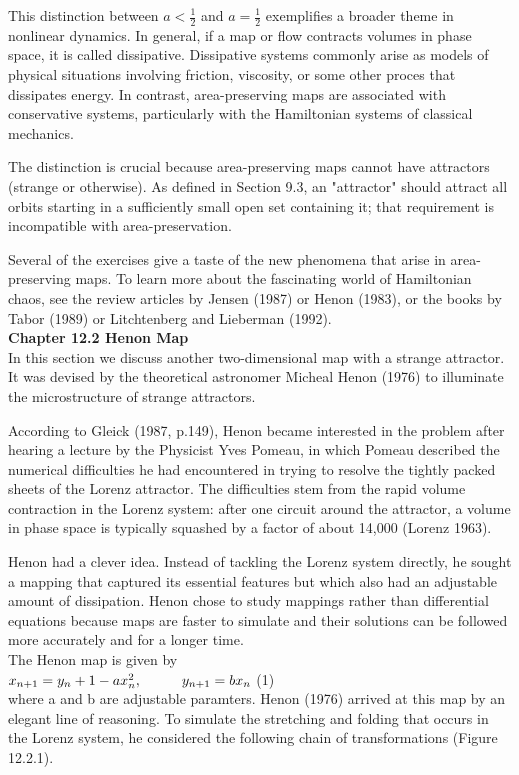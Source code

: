 \documentclass{article}
\newcommand\tab[1][1cm]{\hspace*{#1}}
\begin{document}
This distinction between $a<\frac{1}{2}$ and $a=\frac{1}{2}$ exemplifies a broader theme in nonlinear dynamics. In general, if a map or flow contracts volumes in phase space, it is called dissipative. Dissipative systems commonly arise as models of physical situations involving friction, viscosity, or some other proces that dissipates energy. In contrast, area-preserving maps are associated with conservative systems, particularly with the Hamiltonian systems of classical mechanics. \\ \tab

The distinction is crucial because area-preserving maps cannot have attractors (strange or otherwise). As defined in Section 9.3, an "attractor" should attract all orbits starting in a sufficiently small open set containing it; that requirement is incompatible with area-preservation. \\ \tab

Several of the exercises give a taste of the new phenomena that arise in area-preserving maps. To learn more about the fascinating world of Hamiltonian chaos, see the review articles by Jensen (1987) or Henon (1983), or the books by Tabor (1989) or Litchtenberg and Lieberman (1992). \\

\textbf {Chapter 12.2 Henon Map} \\

In this section we discuss another two-dimensional map with a strange attractor. It was devised by the theoretical astronomer Micheal Henon (1976) to illuminate the microstructure of strange attractors. \\ \tab

According to Gleick (1987, p.149), Henon became interested in the problem after hearing a lecture by the Physicist Yves Pomeau, in which Pomeau described the numerical difficulties he had encountered in trying to resolve the tightly packed sheets of the Lorenz attractor. The difficulties stem from the rapid volume contraction in the Lorenz system: after one circuit around the attractor, a volume in phase space is typically squashed by a factor of about 14,000 (Lorenz 1963). \\ \tab

Henon had a clever idea. Instead of tackling the Lorenz system directly, he sought a mapping that captured its essential features but which also had an adjustable amount of dissipation. Henon chose to study mappings rather than differential equations because maps are faster to simulate and their solutions can be followed more accurately and for a longer time. \\ \tab
The Henon map is given by \\ \tab \tab
$x_{n+1}=y_{n}+1-ax_{n}^{2}, \tab y_{n+1}=bx_{n}$ \tab (1) \\
where a and b are adjustable paramters. Henon (1976) arrived at this map by an elegant line of reasoning. To simulate the stretching and folding that occurs in the Lorenz system, he considered the following chain of transformations (Figure 12.2.1). \\
\end{document}
